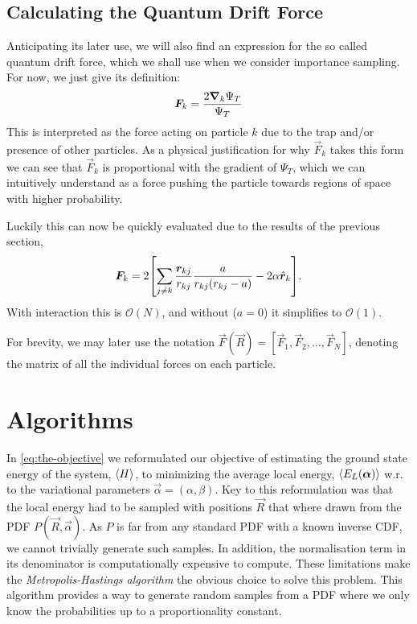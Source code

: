 \documentclass[twocolumn]{article}
\begin{document}
\subsection{Calculating the Quantum Drift Force}
Anticipating its later use, we will also find an expression for the so called
quantum drift force, which we shall use when we consider importance sampling.
For now, we just give its definition:
\begin{align}
    \bm F_k = \frac{2\grad_k\Psi_T}{\Psi_T}\label{eq:Q-force-def}
\end{align}
This is interpreted as the force acting on particle $k$ due to the trap and/or
presence of other particles. As a physical justification for why $\vec F_k$
takes this form we can see that $\vec F_k$ is
proportional with the gradient of $\Psi_T$, which we can intuitively understand
as a force pushing the particle towards regions of space with higher
probability. 

Luckily this can now be quickly evaluated due to
the results of the previous section,
\begin{align}
    \bm F_k = 2\qty[\sum_{j\neq k}\frac{\bm r_{kj}}{r_{kj}}
    \frac{a}{r_{kj}(r_{kj}-a)} - 2\alpha\hat{\bm
    r}_k].\label{eq:Q-force-explicit}
\end{align}
With interaction this is $\mathcal{O}(N)$, and without ($a=0$) it simplifies to $\mathcal{O}(1)$.

For brevity, we may later use the notation $\vec F(\vec R) = [\vec F_1, \vec
F_2,\dots,\vec F_N]$, denoting the matrix of all the individual forces on each
particle.



\section{Algorithms}
In \eqref{eq:the-objective} we reformulated our objective of estimating the ground state energy of the
system, $\expval{H}$, to minimizing the average local energy, $\expval{E_L(\bm\alpha)}$ w.r. to
the variational parameters $\vec \alpha = (\alpha, \beta)$. Key to this
reformulation was that the local energy had to be sampled with positions $\vec
R$ that where drawn from the PDF $P(\vec R, \vec\alpha)$. As $P$ is far from any
standard PDF with a known inverse CDF, we cannot trivially generate such
samples. In addition, the normalisation term in its denominator is
computationally expensive to compute. These limitations make the
\textit{Metropolis-Hastings algorithm} the obvious choice to solve this problem. This
algorithm provides a way to generate random samples from a PDF where we only
know the probabilities up to a proportionality constant.
\end{document}

